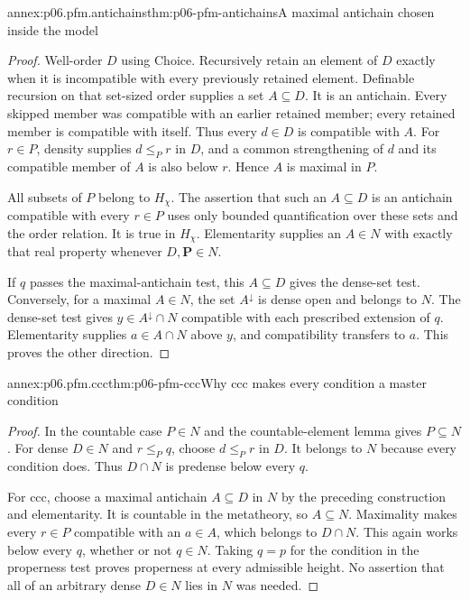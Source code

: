\begin{annexitem}{annex:p06.pfm.antichains}{thm:p06-pfm-antichains}{A maximal antichain chosen inside the model}
\begin{proof}
Well-order \(D\) using Choice. Recursively retain an element of \(D\)
exactly when it is incompatible with every previously retained element.
Definable recursion on that set-sized order supplies a set \(A\subseteq D\).
It is an antichain. Every skipped member was compatible with an earlier
retained member; every retained member is compatible with itself.
Thus every \(d\in D\) is compatible with \(A\).
For \(r\in P\), density supplies \(d\leq_P r\) in \(D\), and a common
strengthening of \(d\) and its compatible member of \(A\) is also below
\(r\). Hence \(A\) is maximal in \(P\).

All subsets of \(P\) belong to \(H_\chi\). The assertion that such an
\(A\subseteq D\) is an antichain compatible with every \(r\in P\)
uses only bounded quantification over these sets and the order relation.
It is true in \(H_\chi\). Elementarity supplies an \(A\in N\) with
exactly that real property whenever \(D,\mathbf P\in N\).

If \(q\) passes the maximal-antichain test, this \(A\subseteq D\)
gives the dense-set test.
Conversely, for a maximal \(A\in N\), the set \(A^\downarrow\)
is dense open and belongs to \(N\).
The dense-set test gives \(y\in A^\downarrow\cap N\) compatible with
each prescribed extension of \(q\).
Elementarity supplies \(a\in A\cap N\) above \(y\), and compatibility
transfers to \(a\). This proves the other direction.
\end{proof}
\end{annexitem}

\begin{annexitem}{annex:p06.pfm.ccc}{thm:p06-pfm-ccc}{Why ccc makes every condition a master condition}
\begin{proof}
In the countable case \(P\in N\) and the countable-element lemma gives
\(P\subseteq N\). For dense \(D\in N\) and \(r\leq_P q\), choose
\(d\leq_P r\) in \(D\). It belongs to \(N\) because every condition does.
Thus \(D\cap N\) is predense below every \(q\).

For ccc, choose a maximal antichain \(A\subseteq D\) in \(N\)
by the preceding construction and elementarity.
It is countable in the metatheory, so \(A\subseteq N\).
Maximality makes every \(r\in P\) compatible with an \(a\in A\),
which belongs to \(D\cap N\). This again works below every \(q\),
whether or not \(q\in N\). Taking \(q=p\) for the condition in the
properness test proves properness at every admissible height.
No assertion that all of an arbitrary dense \(D\in N\) lies in \(N\)
was needed.
\end{proof}
\end{annexitem}


